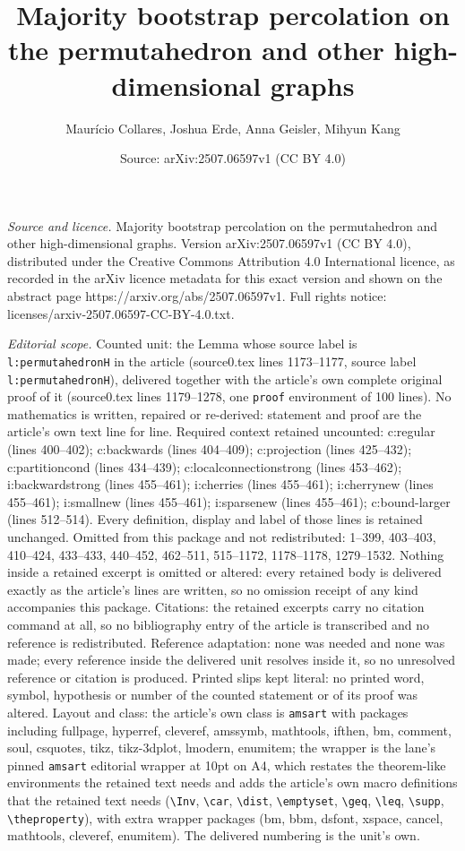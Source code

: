 \documentclass[10pt,a4paper]{amsart}
\title[Majority bootstrap percolation on the permutahedron and othe]{Majority bootstrap percolation on the permutahedron and other high-dimensional graphs}
\author{Maur\'icio Collares, Joshua Erde, Anna Geisler, Mihyun Kang}
\date{Source: arXiv:2507.06597v1 (CC BY 4.0)}
\begin{document}
\maketitle

\noindent\emph{Source and licence.} Majority bootstrap percolation on the permutahedron and other high-dimensional graphs. Version arXiv:2507.06597v1 (CC BY 4.0), distributed under the Creative Commons Attribution 4.0 International licence, as recorded in the arXiv licence metadata for this exact version and shown on the abstract page https://arxiv.org/abs/2507.06597v1. Full rights notice: licenses/arxiv-2507.06597-CC-BY-4.0.txt.\par\smallskip

\noindent\textit{Editorial scope.} Counted unit: the Lemma whose source label is \texttt{l:permutahedronH} in the article (source0.tex lines 1173--1177, source label \texttt{l:permutahedronH}), delivered together with the article's own complete original proof of it (source0.tex lines 1179--1278, one \texttt{proof} environment of 100 lines). No mathematics is written, repaired or re-derived: statement and proof are the article's own text line for line. Required context retained uncounted: c:regular (lines 400--402); c:backwards (lines 404--409); c:projection (lines 425--432); c:partitioncond (lines 434--439); c:localconnectionstrong (lines 453--462); i:backwardstrong (lines 455--461); i:cherries (lines 455--461); i:cherrynew (lines 455--461); i:smallnew (lines 455--461); i:sparsenew (lines 455--461); c:bound-larger (lines 512--514). Every definition, display and label of those lines is retained unchanged. Omitted from this package and not redistributed: 1--399, 403--403, 410--424, 433--433, 440--452, 462--511, 515--1172, 1178--1178, 1279--1532. Nothing inside a retained excerpt is omitted or altered: every retained body is delivered exactly as the article's lines are written, so no omission receipt of any kind accompanies this package. Citations: the retained excerpts carry no citation command at all, so no bibliography entry of the article is transcribed and no reference is redistributed. Reference adaptation: none was needed and none was made; every reference inside the delivered unit resolves inside it, so no unresolved reference or citation is produced. Printed slips kept literal: no printed word, symbol, hypothesis or number of the counted statement or of its proof was altered. Layout and class: the article's own class is \texttt{amsart} with packages including fullpage, hyperref, cleveref, amssymb, mathtools, ifthen, bm, comment, soul, csquotes, tikz, tikz-3dplot, lmodern, enumitem; the wrapper is the lane's pinned \texttt{amsart} editorial wrapper at 10pt on A4, which restates the theorem-like environments the retained text needs and adds the article's own macro definitions that the retained text needs (\texttt{\textbackslash Inv}, \texttt{\textbackslash car}, \texttt{\textbackslash dist}, \texttt{\textbackslash emptyset}, \texttt{\textbackslash geq}, \texttt{\textbackslash leq}, \texttt{\textbackslash supp}, \texttt{\textbackslash theproperty}), with extra wrapper packages (bm, bbm, dsfont, xspace, cancel, mathtools, cleveref, enumitem). The delivered numbering is the unit's own. 
\end{document}
